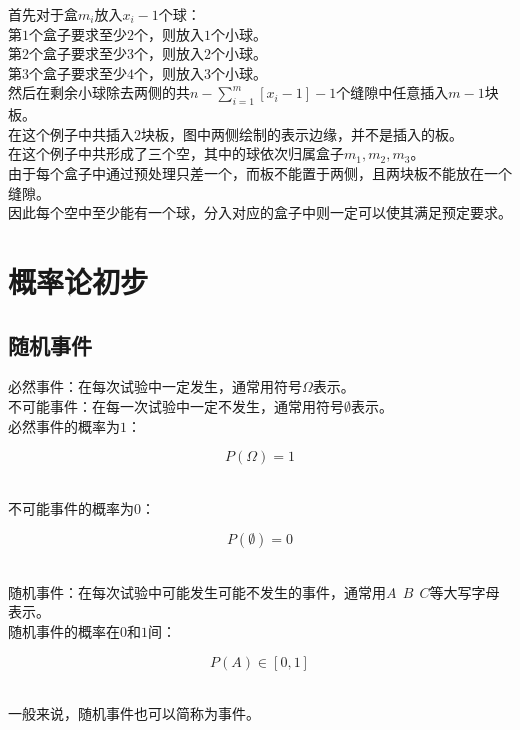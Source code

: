 \documentclass[UTF8]{ctexart}
\begin{document}
    首先对于盒$m_i$放入$x_i-1$个球：\\[3mm]
    第$1$个盒子要求至少$2$个，则放入$1$个小球。\\[3mm]
    第$2$个盒子要求至少$3$个，则放入$2$个小球。\\[3mm]
    第$3$个盒子要求至少$4$个，则放入$3$个小球。\\[5mm]
    然后在剩余小球除去两侧的共$n-\sum_{i=1}^{m}[x_i-1]-1$个缝隙中任意插入$m-1$块板。\\[3mm]
    在这个例子中共插入$2$块板，图中两侧绘制的表示边缘，并不是插入的板。\\[3mm]
    在这个例子中共形成了三个空，其中的球依次归属盒子$m_1,m_2,m_3$。\\[3mm]
    由于每个盒子中通过预处理只差一个，而板不能置于两侧，且两块板不能放在一个缝隙。\\[3mm]
    因此每个空中至少能有一个球，分入对应的盒子中则一定可以使其满足预定要求。

\newpage

\section{概率论初步}
    
\subsection{随机事件}
    必然事件：在每次试验中一定发生，通常用符号$\Omega$表示。\\[3mm]
    不可能事件：在每一次试验中一定不发生，通常用符号$\emptyset$表示。\\[3mm]
    必然事件的概率为$1$：
    \begin{large}
        \begin{equation*}
            P(\Omega)=1
        \end{equation*}
    \end{large}\\
    不可能事件的概率为$0$：
    \begin{large}
        \begin{equation*}
            P(\emptyset)=0
        \end{equation*}
    \end{large}\\[1mm]
    随机事件：在每次试验中可能发生可能不发生的事件，通常用$A~~B~~C$等大写字母表示。\\[3mm]
    随机事件的概率在$0$和$1$间：
    \begin{large}
        \begin{equation*}
            P(A)\in[0,1]
        \end{equation*}
    \end{large}\\
    一般来说，随机事件也可以简称为事件。
\end{document}
